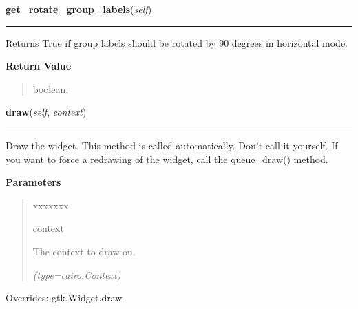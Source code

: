     \label{pygtk_chart:multi_bar_chart:MultiBarChart:get_rotate_group_labels}

    \vspace{0.5ex}

\hspace{.8\funcindent}\begin{boxedminipage}{\funcwidth}

    \raggedright \textbf{get\_rotate\_group\_labels}(\textit{self})

    \vspace{-1.5ex}

    \rule{\textwidth}{0.5\fboxrule}
\setlength{\parskip}{2ex}
    Returns True if group labels should be rotated by 90 degrees in 
    horizontal mode.

\setlength{\parskip}{1ex}
      \textbf{Return Value}
    \vspace{-1ex}

      \begin{quote}
      boolean.

      \end{quote}

    \end{boxedminipage}

    \vspace{0.5ex}

\hspace{.8\funcindent}\begin{boxedminipage}{\funcwidth}

    \raggedright \textbf{draw}(\textit{self}, \textit{context})

    \vspace{-1.5ex}

    \rule{\textwidth}{0.5\fboxrule}
\setlength{\parskip}{2ex}
    Draw the widget. This method is called automatically. Don't call it 
    yourself. If you want to force a redrawing of the widget, call the 
    queue\_draw() method.

\setlength{\parskip}{1ex}
      \textbf{Parameters}
      \vspace{-1ex}

      \begin{quote}
        \begin{Ventry}{xxxxxxx}

          \item[context]

          The context to draw on.

            {\it (type=cairo.Context)}

        \end{Ventry}

      \end{quote}

      Overrides: gtk.Widget.draw

    \end{boxedminipage}

